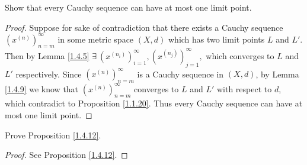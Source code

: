 \begin{exercise}\label{ex 1.4.6}
    Show that every Cauchy sequence can have at most one limit point.
\end{exercise}

\begin{proof}
    Suppose for sake of contradiction that there exists a Cauchy sequence \((x^{(n)})_{n = m}^\infty\) in some metric space \((X, d)\) which has two limit points \(L\) and \(L'\).
    Then by Lemma \ref{1.4.5} \(\exists\ (x^{(n_i)})_{i = 1}^\infty, (x^{(n_j)})_{j = 1}^\infty,\) which converges to \(L\) and \(L'\) respectively.
    Since \((x^{(n)})_{n = m}^\infty\) is a Cauchy sequence in \((X, d)\), by Lemma \ref{1.4.9} we know that \((x^{(n)})_{n = m}^\infty\) converges to \(L\) and \(L'\) with respect to \(d\), which contradict to Proposition \ref{1.1.20}.
    Thus every Cauchy sequence can have at most one limit point.
\end{proof}

\begin{exercise}\label{ex 1.4.7}
    Prove Proposition \ref{1.4.12}.
\end{exercise}

\begin{proof}
    See Proposition \ref{1.4.12}.
\end{proof}

